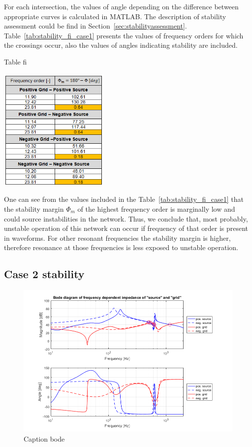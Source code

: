 \documentclass[12pt]{report} %
\begin{document}
For each intersection, the values of angle depending on the difference between appropriate curves is calculated in MATLAB. The description of stability assessment could be find in Section~\ref{sec:stabilityassessment}. Table~\ref{tab:stability_fi_case1} presents the values of frequency orders for which the crossings occur, also the values of angles indicating stability are included.

\begin{table}[htb]
	\centering
	\caption{Table fi}
	\includegraphics[width=0.4\textwidth]{img/Case1/stability_fi.png}
  	\label{tab:stability_fi_case1}
\end{table}
\FloatBarrier

One can see from the values included in the Table~\ref{tab:stability_fi_case1} that the stability margin $\Phi_m$ of the highest frequency order is marginally low and could source instabilities in the network. Thus, we conclude that, most probably, unstable operation of this network can occur if frequency of that order is present in waveforms. For other resonant frequencies the stability margin is higher, therefore resonance at those frequencies is less exposed to unstable operation.

\subsection{Case 2 stability}

\begin{figure}[htb]
	\centering
	\includegraphics[width=1\textwidth]{img/Case2/Case2_Bode.png}
	\caption{Caption bode}
  	\label{fig:bode_case2}
\end{figure}
\FloatBarrier
\end{document}
